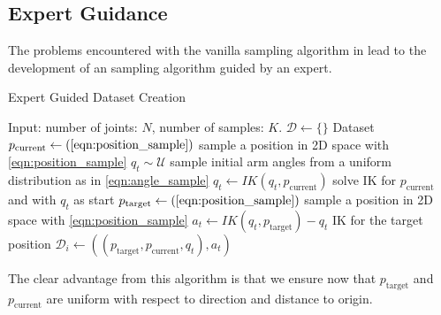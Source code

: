 \subsection{Expert Guidance}

The problems encountered with the vanilla sampling algorithm in  lead to the development of an sampling algorithm guided by an expert. 

\begin{algorithm}
    \caption{Expert Guided Dataset Creation}\label{alg:Expert_Dataset}
    \begin{algorithmic}
        \State{} Input: number of joints: $N$, number of samples: $K$.
        \State{} $\mathcal{D} \leftarrow \{\}$  Dataset
            \State{} $p_{\text{current}} \leftarrow (\text{\ref{eqn:position_sample}})$ sample a position in 2D space with \eqref{eqn:position_sample}
            \State{} $q_t \sim \mathcal{U}$ sample initial arm angles from a uniform distribution as in \eqref{eqn:angle_sample}
            \State{} $q_t \leftarrow IK(q_t, p_{\text{current}})$ solve IK for $p_{\text{current}}$ and with $q_t$ as start
            \State{} $p_{\text{target}} \leftarrow (\text{\ref{eqn:position_sample}})$ sample a position in 2D space with \eqref{eqn:position_sample}
            \State{} $a_t \leftarrow IK(q_t, p_{\text{target}}) - q_t$ IK for the target position
            \State{} $\mathcal{D}_i \leftarrow ((p_{\text{target}}, p_{\text{current}}, q_t), a_t)$
        \EndFor{}
\end{algorithmic}
\end{algorithm}
The clear advantage from this algorithm is that we ensure now that $p_{\text{target}}$ and $p_{\text{current}}$ are uniform with respect to direction and distance to origin.

